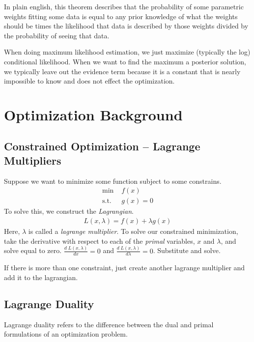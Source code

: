 \documentclass[11pt]{article}
\begin{document}
In plain english, this theorem describes that the probability of some parametric weights fitting some data is equal to any prior knowledge of what the weights should be times the likelihood that data is described by those weights divided by the probability of seeing that data. 

When doing maximum likelihood estimation, we just maximize (typically the log) conditional likelihood. When we want to find the maximum a posterior solution, we typically leave out the evidence term because it is a constant that is nearly impossible to know and does not effect the optimization.

\section{Optimization Background}
\subsection{Constrained Optimization -- Lagrange Multipliers}
Suppose we want to minimize some function subject to some constrains.
\begin{align*}
\text{min }& f(x)\\
\text{s.t. }& g(x) = 0
\end{align*}
To solve this, we construct the {\it Lagrangian}. 
\begin{align*}
L(x,\lambda) = f(x) + \lambda g(x)
\end{align*}
Here, $\lambda$ is called a {\it lagrange multiplier}. To solve our constrained minimization, take the derivative with respect to each of the {\it primal} variables, $x$ and $\lambda$, and solve equal to zero. $\frac{d\;L(x,\lambda)}{dx}=0$ and  $\frac{d\;L(x,\lambda)}{d\lambda }=0$. Substitute and solve.

If there is more than one constraint, just create another lagrange multiplier and add it to the lagrangian.

\subsection{Lagrange Duality}
\label{sec:lagrange-duality}
Lagrange duality refers to the difference between the dual and primal formulations of an optimization problem.
\end{document}
